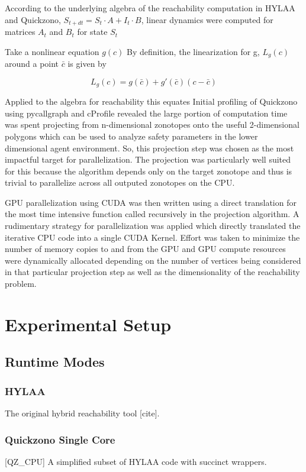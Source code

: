 \documentclass[runningheads]{llncs}
\begin{document}
According to the underlying algebra of the reachability computation in HYLAA and Quickzono, $S_{t+dt} = S_t \cdot A + I_t \cdot B$, linear dynamics were computed for matrices $A_t$ and $B_t$ for state $S_t$

Take a nonlinear equation $g(c)$ By definition, the linearization for g, $L_g(c)$ around a point $\bar{c}$ is given by

$$L_g(c) = g(\bar{c}) + g'(\bar{c})(c-\bar{c})$$

Applied to the algebra for reachability this equates
Initial profiling of Quickzono using pycallgraph and cProfile revealed the large portion of computation time was spent projecting from n-dimensional zonotopes onto the useful 2-dimensional polygons which can be used to analyze safety parameters in the lower dimensional agent environment. So, this projection step was chosen as the most impactful target for parallelization. The projection was particularly well suited for this because the algorithm depends only on the target zonotope and thus is trivial to parallelize across all outputed zonotopes on the CPU.

GPU parallelization using CUDA was then written using a direct translation for the most time intensive function called recursively in the projection algorithm. A rudimentary strategy for parallelization was applied which directly translated the iterative CPU code into a single CUDA Kernel. Effort was taken to minimize the number of memory copies to and from the GPU and GPU compute resources were dynamically allocated depending on the number of vertices being considered in that particular projection step as well as the dimensionality of the reachability problem.

\section{Experimental Setup}


\subsection{Runtime Modes}

\subsubsection{HYLAA} \newline The original hybrid reachability tool [cite].
\vspace*{-5pt}
\subsubsection{Quickzono Single Core} [QZ\_CPU] \newline A simplified subset of HYLAA code with succinct wrappers. 
\vspace*{-5pt}
\end{document}
